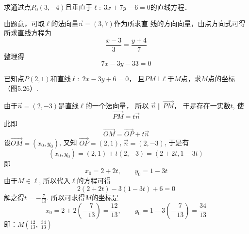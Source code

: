 \begin{example}
     求通过点$P_0(3,-4)$且垂直于$\ell:\; 3x+7y-6=0$的直线方程．
\end{example}

\begin{solution}
    由题意，可取$\ell$的法向量$\vec{n}=(3,7)$作为所求直
线的方向向量，由点方向式可得所求直线方程为
\[\frac{x-3}{3}=\frac{y+4}{7}\]
整理得
\[7x-3y-33=0\]
\end{solution}

\begin{example}
    已知点$P(2,1)$和直线$\ell:\; 2x-3y+6=0$，
且$PM\bot\ell $于$M$点，求$M$点的坐标（图5.26）.
\end{example}

\begin{figure}[htp]
    \centering
{}
    \caption{}
\end{figure}

\begin{solution}
    由于$\vec{n}=(2,-3)$是直线$\ell$的一个法向量，
所以
$\vec{n}\parallel \Vec{PM}$，
于是存在一实数$t$, 使
\[\Vec{PM}=t\vec{n}\]
此即
\[\Vec{OM}=\Vec{OP}+t\vec{n}\]
设$\Vec{OM}=(x_0,y_0)$, 又知
$\Vec{OP}=(2,1)$, $\vec{n}=(2,-3)$, 
于是有
\[(x_0,y_0)=(2,1)+t(2,-3)=(2+2t,1-3t)\]
即
\[x_0=2+2t,\qquad y_0=1-3t\]
由于$M\in\ell$, 所以代入$\ell$的方程可得
\[2(2+2t)-3(1-3t)+6=0\]
解之得$t=-\frac{7}{13}$. 所以可求得$M$的坐标是
\[x_0=2+2\left(-\frac{7}{13}\right)=\frac{12}{13},\qquad y_0=1-3\left(-\frac{7}{13}\right)=\frac{34}{13}\]
即：$M\left(\frac{12}{13},\; \frac{34}{13}\right)$
\end{solution}

